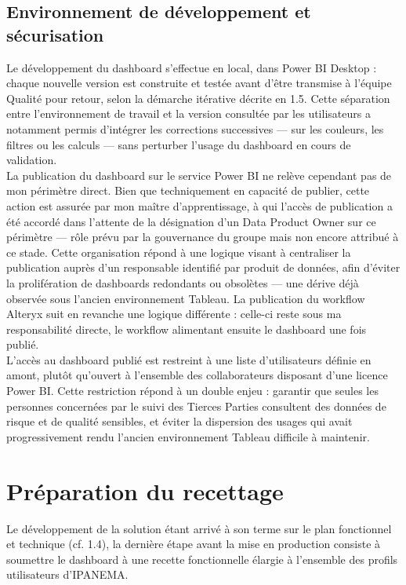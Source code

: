 \subsection{Environnement de développement et sécurisation}

Le développement du dashboard s'effectue en local, dans Power BI Desktop : chaque 
nouvelle version est construite et testée avant d'être transmise à l'équipe Qualité pour 
retour, selon la démarche itérative décrite en 1.5. Cette séparation entre 
l'environnement de travail et la version consultée par les utilisateurs a notamment 
permis d'intégrer les corrections successives — sur les couleurs, les filtres ou les 
calculs — sans perturber l'usage du dashboard en cours de validation. \\

La publication du dashboard sur le service Power BI ne relève cependant pas de mon 
périmètre direct. Bien que techniquement en capacité de publier, cette action est 
assurée par mon maître d'apprentissage, à qui l'accès de publication a été accordé 
dans l'attente de la désignation d'un Data Product Owner sur ce périmètre — rôle prévu 
par la gouvernance du groupe mais non encore attribué à ce stade. Cette organisation 
répond à une logique visant à centraliser la publication auprès d'un responsable 
identifié par produit de données, afin d'éviter la prolifération de dashboards redondants 
ou obsolètes — une dérive déjà observée sous l'ancien environnement Tableau. La 
publication du workflow Alteryx suit en revanche une logique différente : celle-ci reste 
sous ma responsabilité directe, le workflow alimentant ensuite le dashboard une fois 
publié. \\

L'accès au dashboard publié est restreint à une liste d'utilisateurs définie en amont, 
plutôt qu'ouvert à l'ensemble des collaborateurs disposant d'une licence Power BI. 
Cette restriction répond à un double enjeu : garantir que seules les personnes 
concernées par le suivi des Tierces Parties consultent des données de risque et de 
qualité sensibles, et éviter la dispersion des usages qui avait progressivement rendu 
l'ancien environnement Tableau difficile à maintenir.

\section{Préparation du recettage}

Le développement de la solution étant arrivé à son terme sur le plan fonctionnel et technique 
(cf. 1.4), la dernière étape avant la mise en production consiste à soumettre le dashboard à 
une recette fonctionnelle élargie à l'ensemble des profils utilisateurs d'IPANEMA. \\

